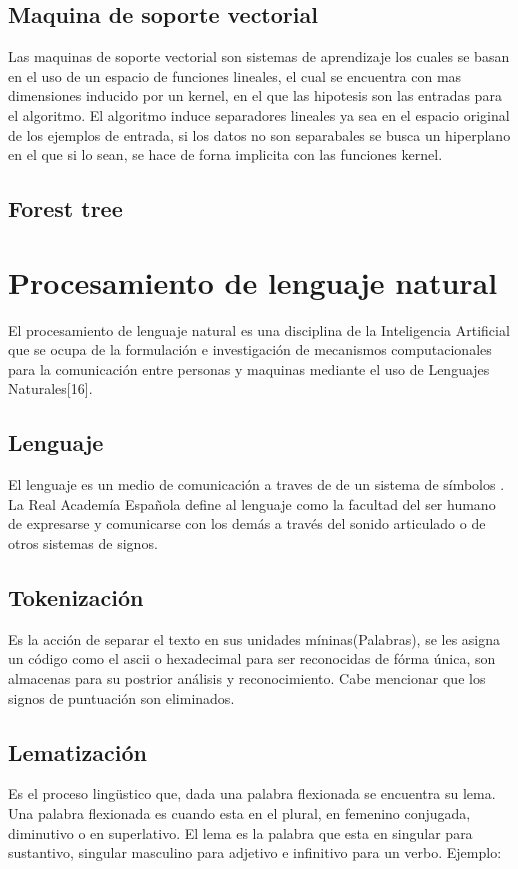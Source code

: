 \subsection{Maquina de soporte vectorial}
Las maquinas de soporte vectorial son sistemas de aprendizaje los cuales
se basan en el uso de un espacio de funciones lineales, el cual se encuentra con
mas dimensiones inducido por un kernel, en el que las hipotesis son las entradas
para el algoritmo.
El algoritmo induce separadores lineales ya sea en el espacio original de los
ejemplos de entrada, si los datos no son separabales se busca un hiperplano en
el que si lo sean, se hace de forna implicita con las funciones kernel.\\

\subsection{Forest tree}




\section{Procesamiento de lenguaje natural}
El procesamiento de lenguaje natural es una disciplina de la Inteligencia Artificial que se ocupa de la 
formulación e investigación de mecanismos computacionales para la comunicación entre personas y maquinas 
mediante el uso de Lenguajes Naturales[16].

\subsection{Lenguaje}
El lenguaje es un medio de comunicación a traves de de un sistema de símbolos \cite{dieciseis}.
La Real Academía Española define al lenguaje como la facultad del ser humano de expresarse y 
comunicarse con los demás a través del sonido articulado o de otros sistemas de signos.


\subsection{Tokenización}
Es la acción de separar el texto en sus unidades míninas(Palabras), se les
asigna un código como el ascii o hexadecimal para ser reconocidas de fórma
única, son almacenas para su postrior análisis y reconocimiento. Cabe mencionar que los
signos de puntuación son eliminados.

\subsection{Lematización}
Es el proceso lingüstico que, dada una palabra flexionada se encuentra su
lema. Una palabra flexionada es cuando esta en el plural, en femenino conjugada,
diminutivo o en superlativo. El lema es la palabra que esta en singular para
sustantivo, singular masculino para adjetivo e infinitivo para un verbo. Ejemplo:

